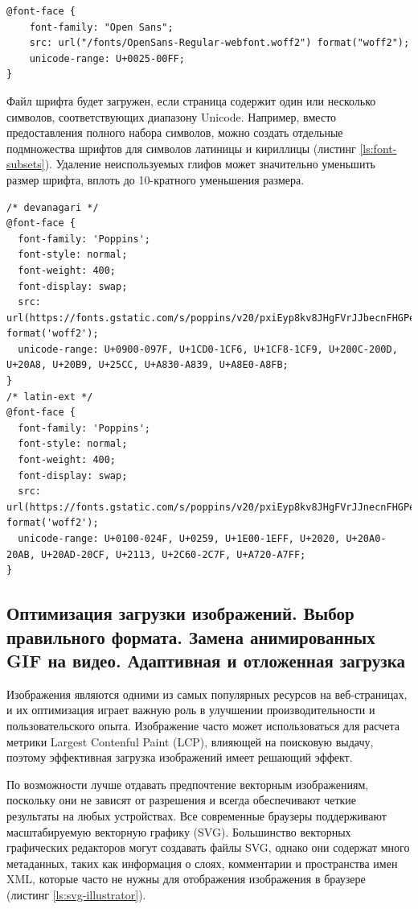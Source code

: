 \begin{lstlisting}[caption={Пример определения unicode диапозона}, label={ls:unicode-range}]
@font-face {
    font-family: "Open Sans";
    src: url("/fonts/OpenSans-Regular-webfont.woff2") format("woff2");
    unicode-range: U+0025-00FF;
}
\end{lstlisting}

Файл шрифта будет загружен, если страница содержит один или несколько символов, соответствующих диапазону Unicode. Например, вместо предоставления полного набора символов, можно создать отдельные подмножества шрифтов для символов латиницы и кириллицы (листинг \ref{ls:font-subsets}). Удаление неиспользуемых глифов может значительно уменьшить размер шрифта, вплоть до 10-кратного уменьшения размера.

\begin{lstlisting}[caption={Пример создания нескольких подмножеств шрифта}, label={ls:font-subsets}]
/* devanagari */
@font-face {
  font-family: 'Poppins';
  font-style: normal;
  font-weight: 400;
  font-display: swap;
  src: url(https://fonts.gstatic.com/s/poppins/v20/pxiEyp8kv8JHgFVrJJbecnFHGPezSQ.woff2) format('woff2');
  unicode-range: U+0900-097F, U+1CD0-1CF6, U+1CF8-1CF9, U+200C-200D, U+20A8, U+20B9, U+25CC, U+A830-A839, U+A8E0-A8FB;
}
/* latin-ext */
@font-face {
  font-family: 'Poppins';
  font-style: normal;
  font-weight: 400;
  font-display: swap;
  src: url(https://fonts.gstatic.com/s/poppins/v20/pxiEyp8kv8JHgFVrJJnecnFHGPezSQ.woff2) format('woff2');
  unicode-range: U+0100-024F, U+0259, U+1E00-1EFF, U+2020, U+20A0-20AB, U+20AD-20CF, U+2113, U+2C60-2C7F, U+A720-A7FF;
}
\end{lstlisting}

\subsection{Оптимизация загрузки изображений. Выбор правильного формата. Замена анимированных GIF на видео. Адаптивная и отложенная загрузка}

Изображения являются одними из самых популярных ресурсов на веб-страницах, и их оптимизация играет важную роль в улучшении производительности и пользовательского опыта. Изображение часто может использоваться для расчета метрики Largest Contenful Paint (LCP), влияющей на поисковую выдачу, поэтому эффективная загрузка изображений имеет решающий эффект.

По возможности лучше отдавать предпочтение векторным изображениям, поскольку они не зависят от разрешения и всегда обеспечивают четкие результаты на любых устройствах. Все современные браузеры поддерживают масштабируемую векторную графику (SVG). Большинство векторных графических редакторов могут создавать файлы SVG, однако они содержат много метаданных, таких как информация о слоях, комментарии и пространства имен XML, которые часто не нужны для отображения изображения в браузере (листинг \ref{ls:svg-illustrator}).

